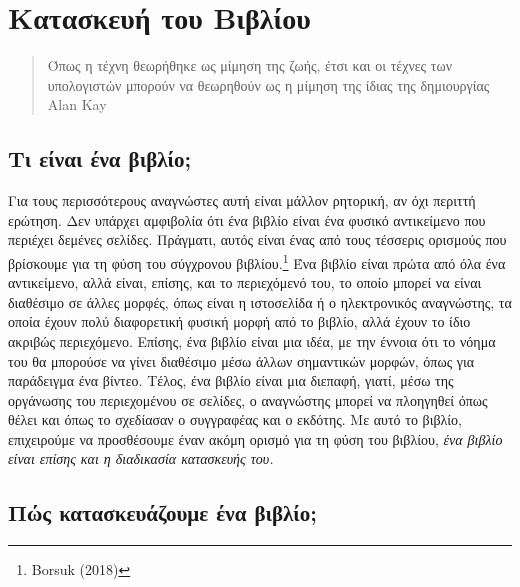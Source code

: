 \documentclass[
]{article}
\author{}
\date{}
\begin{document}


\hypertarget{ux3baux3b1ux3c4ux3b1ux3c3ux3baux3b5ux3c5ux3ae-ux3c4ux3bfux3c5-ux3b2ux3b9ux3b2ux3bbux3afux3bfux3c5}{%
\section{Κατασκευή του
Βιβλίου}\label{ux3baux3b1ux3c4ux3b1ux3c3ux3baux3b5ux3c5ux3ae-ux3c4ux3bfux3c5-ux3b2ux3b9ux3b2ux3bbux3afux3bfux3c5}}

\begin{quote}
Όπως η τέχνη θεωρήθηκε ως μίμηση της ζωής, έτσι και οι τέχνες των
υπολογιστών μπορούν να θεωρηθούν ως η μίμηση της ίδιας της δημιουργίας
Alan Kay
\end{quote}

\hypertarget{ux3c4ux3b9-ux3b5ux3afux3bdux3b1ux3b9-ux3adux3bdux3b1-ux3b2ux3b9ux3b2ux3bbux3afux3bf}{%
\subsection{Τι είναι ένα
βιβλίο;}\label{ux3c4ux3b9-ux3b5ux3afux3bdux3b1ux3b9-ux3adux3bdux3b1-ux3b2ux3b9ux3b2ux3bbux3afux3bf}}

Για τους περισσότερους αναγνώστες αυτή είναι μάλλον ρητορική, αν όχι
περιττή ερώτηση. Δεν υπάρχει αμφιβολία ότι ένα βιβλίο είναι ένα φυσικό
αντικείμενο που περιέχει δεμένες σελίδες. Πράγματι, αυτός είναι ένας από
τους τέσσερις ορισμούς που βρίσκουμε για τη φύση του σύγχρονου
βιβλίου.\footnote{Borsuk (2018)} Ένα βιβλίο είναι πρώτα από όλα ένα
αντικείμενο, αλλά είναι, επίσης, και το περιεχόμενό του, το οποίο μπορεί
να είναι διαθέσιμο σε άλλες μορφές, όπως είναι η ιστοσελίδα ή ο
ηλεκτρονικός αναγνώστης, τα οποία έχουν πολύ διαφορετική φυσική μορφή
από το βιβλίο, αλλά έχουν το ίδιο ακριβώς περιεχόμενο. Επίσης, ένα
βιβλίο είναι μια ιδέα, με την έννοια ότι το νόημα του θα μπορούσε να
γίνει διαθέσιμο μέσω άλλων σημαντικών μορφών, όπως για παράδειγμα ένα
βίντεο. Τέλος, ένα βιβλίο είναι μια διεπαφή, γιατί, μέσω της οργάνωσης
του περιεχομένου σε σελίδες, ο αναγνώστης μπορεί να πλοηγηθεί όπως θέλει
και όπως το σχεδίασαν ο συγγραφέας και ο εκδότης. Με αυτό το βιβλίο,
επιχειρούμε να προσθέσουμε έναν ακόμη ορισμό για τη φύση του βιβλίου,
\emph{ένα βιβλίο είναι επίσης και η διαδικασία κατασκευής του.}

\hypertarget{ux3c0ux3ceux3c2-ux3baux3b1ux3c4ux3b1ux3c3ux3baux3b5ux3c5ux3acux3b6ux3bfux3c5ux3bcux3b5-ux3adux3bdux3b1-ux3b2ux3b9ux3b2ux3bbux3afux3bf}{%
\subsection{Πώς κατασκευάζουμε ένα
βιβλίο;}\label{ux3c0ux3ceux3c2-ux3baux3b1ux3c4ux3b1ux3c3ux3baux3b5ux3c5ux3acux3b6ux3bfux3c5ux3bcux3b5-ux3adux3bdux3b1-ux3b2ux3b9ux3b2ux3bbux3afux3bf}}
\end{document}
